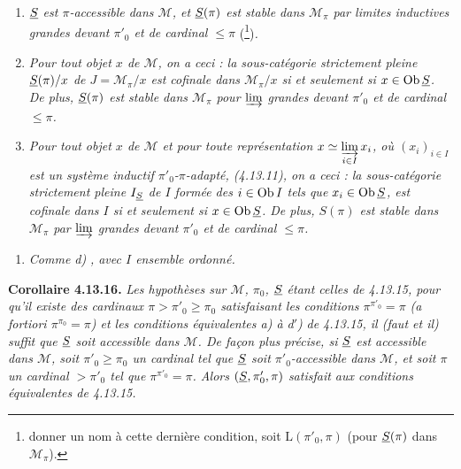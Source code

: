 \begin{enumerate}
\item[a$'$)] \textit{$\underline{S}$ est $\pi$-accessible dans $\mathcal{M}$, et $\underline{S}(\pi)$ est stable dans $\mathcal{M}_\pi$ par limites inductives grandes devant $\pi'_0$ et de cardinal $\leqslant \pi$} (\footnote[136]{donner un nom à cette dernière condition, soit $\mathrm{L}(\pi'_0, \pi)$ (pour $\underline{S}(\pi)$ dans $\mathcal{M}_\pi$).})\textit{.}
\item[b)] \textit{Pour tout objet $x$ de $\mathcal{M}$, on a ceci : la sous-catégorie strictement pleine $\underline{S}(\pi)/x$ de $J = \mathcal{M}_\pi/x$ est cofinale dans $\mathcal{M}_\pi/x$ si et seulement si $x \in \operatorname{Ob}\underline{S}$. De plus, $\underline{S}(\pi)$ est stable dans $\mathcal{M}_\pi$ pour $\varinjlim$ grandes devant $\pi'_0$ et de cardinal $\leqslant \pi$.}
\item[\circlabel{c}] \textit{Pour tout objet $x$ de $\mathcal{M}$ et pour toute représentation $x \simeq \varinjlim\limits_{i\in I} x_i$, où $(x_i)_{i\in I}$ est un système inductif $\pi'_0$-$\pi$-adapté, (4.13.11), on a ceci : la sous-catégorie strictement pleine $I_{\underline{S}}$ de $I$ formée des $i \in \operatorname{Ob} I$ tels que $x_i \in \operatorname{Ob}\underline{S}$, est cofinale dans $I$ si et seulement si $x \in \operatorname{Ob}\underline{S}$. De plus, $S(\pi)$ est stable dans $\mathcal{M}_\pi$ par $\varinjlim$ grandes devant $\pi'_0$ et de cardinal $\leqslant \pi$.} %
\end{enumerate}
\begin{enumerate}
\item[c$'$)] \textit{Comme d)} \textit{, avec $I$ ensemble ordonné.}
\end{enumerate}
\noindent\textbf{Corollaire 4.13.16.} \textit{Les hypothèses sur $\mathcal{M}$, $\pi_0$, $\underline{S}$ étant celles de 4.13.15, pour qu'il existe des cardinaux $\pi > \pi'_0 \geqslant \pi_0$ satisfaisant les conditions $\pi^{\pi'_0} = \pi$ (a fortiori $\pi^{\pi_0} = \pi$) et les conditions équivalentes a) à d$'$)} \textit{de 4.13.15, il (faut et il) suffit que $\underline{S}$ soit accessible dans $\mathcal{M}$. De façon plus précise, si $\underline{S}$ est accessible dans $\mathcal{M}$, soit $\pi'_0 \geqslant \pi_0$ un cardinal tel que $\underline{S}$ soit $\pi'_0$-accessible dans $\mathcal{M}$, et soit $\pi$ un cardinal $> \pi'_0$ tel que $\pi^{\pi'_0} = \pi$. Alors $(\underline{S}, \pi'_0, \pi)$ satisfait aux conditions équivalentes de 4.13.15.}


